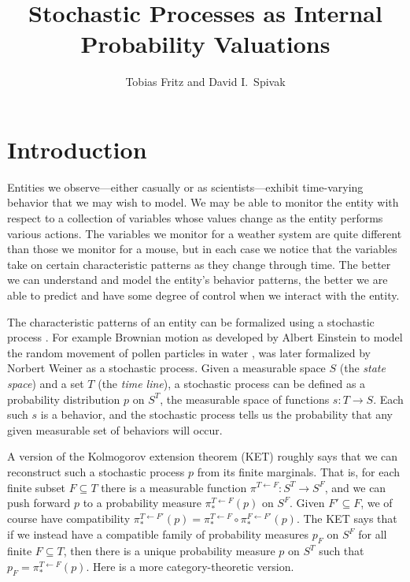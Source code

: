 \documentclass[11pt, oneside, article]{memoir}
\theoremstyle{plain}
\theoremstyle{definition}
\theoremstyle{remark}
\renewcommand{\ss}{\subseteq}
\newcommand{\from}{\leftarrow}
\begin{document}
\title{Stochastic Processes as Internal Probability Valuations}
\author{Tobias Fritz and David I.\ Spivak}
\date{\vspace{-.3in}}

\maketitle

\begin{abstract}

\end{abstract}

\tableofcontents*


\chapter{Introduction}

Entities we observe---either casually or as scientists---exhibit time-varying behavior that we may wish to model. We may be able to monitor the entity with respect to a collection of variables whose values change as the entity performs various actions. The variables we monitor for a weather system are quite different than those we monitor for a mouse, but in each case we notice that the variables take on certain characteristic patterns as they change through time. The better we can understand and model the entity's behavior patterns, the better we are able to predict and have some degree of control when we interact with the entity.

The characteristic patterns of an entity can be formalized using a stochastic process \cite{doob1934stochastic}. For example Brownian motion as developed by Albert Einstein to model the random movement of pollen particles in water \cite{einstein1956investigations}, was later formalized by Norbert Weiner as a stochastic process. Given a measurable space $S$ (the \emph{state space}) and a set $T$ (the \emph{time line}), a stochastic process can be defined as a probability distribution $p$ on $S^T$, the measurable space of functions $s\colon T\to S$. Each such $s$ is a behavior, and the stochastic process tells us the probability that any given measurable set of behaviors will occur.

A version of the Kolmogorov extension theorem (KET) roughly says that we can reconstruct such a stochastic process $p$ from its finite marginals. That is, for each finite subset $F\ss T$ there is a measurable function $\pi^{T\from F}\colon S^T\to S^F$, and we can push forward $p$ to a probability measure $\pi^{T\from F}_*(p)$ on $S^F$. Given $F'\ss F$, we of course have compatibility $\pi^{T\from F'}_*(p)=\pi^{T\from F}_*\circ\pi^{F\from F'}_*(p)$. The KET says that if we instead have a compatible family of probability measures $p_F$ on $S^F$ for all finite $F\ss T$, then there is a unique probability measure $p$ on $S^T$ such that $p_F=\pi^{T\from F}_*(p)$. Here is a more category-theoretic version.
\end{document}
